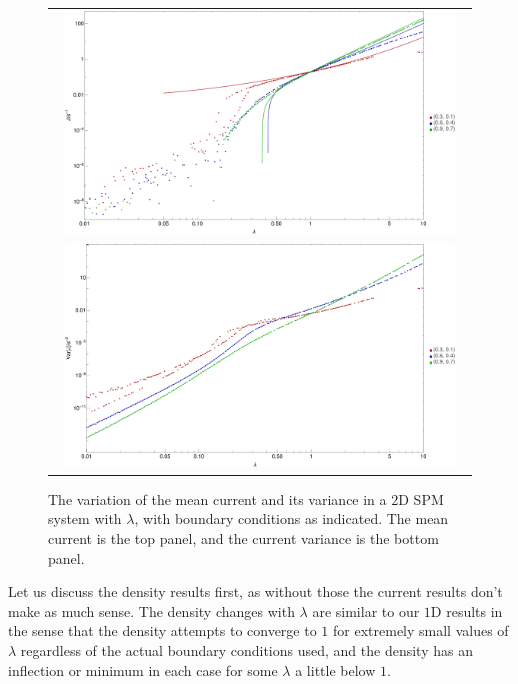\begin{figure} \caption[The variation of the mean current and its variance in a $2$D SPM system
with $\lambda$.]{The variation of the mean current and its variance in a $2$D SPM system
with $\lambda$, with boundary conditions as indicated. The mean current is the top panel,
and the current variance is the bottom panel.} 
\label{fig:2dSysCurr}
\begin{center}
\begin{tabular}{c}
\includegraphics[width=0.95\textwidth]{numerics/images/2d/2dCurrentMeans} \\
\includegraphics[width=0.95\textwidth]{numerics/images/2d/2dCurrentVars} \\
\end{tabular}
\end{center}
\end{figure}

Let us discuss the density results first, as without those the current results don't make as
much sense. The density changes with $\lambda$ are similar to our $1$D results in the sense
that the density attempts to converge to $1$ for extremely small values of $\lambda$ regardless
of the actual boundary conditions used, and the density has an inflection or minimum in each case for some
$\lambda$ a little below $1$.

